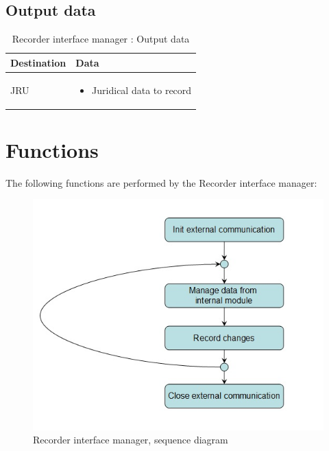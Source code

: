 \documentclass[nocc]{template/openetcs_report}
\begin{document}
\subsection{Output data}
			\begin{longtable}{|l|l|}
				\caption{Recorder interface manager : Output data}\\ 
				\hline
				
					\begin{minipage}[t]{0.35\linewidth} \textbf{Destination}	\end{minipage} 
				&	\begin{minipage}[t]{0.65\linewidth} \textbf{Data} \end{minipage} \\
				
				\hline
																																									
					\begin{minipage}[t]{0.35\linewidth} JRU	\end{minipage} 
				&	\begin{minipage}[t]{0.65\linewidth}
						\begin{itemize}
							\item Juridical data to record
						\end{itemize}
					\end{minipage} \\
				
				\hline
			\end{longtable}
\newpage				
\section{Functions}
The following functions are performed by the Recorder interface manager:
\begin{figure}[!h]
  \centering
  \includegraphics[width=\textwidth]{image/evc_recorder_interf_manager}
  \caption{Recorder interface manager, sequence diagram}
  \label{fig:Recorder interface manager, sequence diagram}
\end{figure}
\end{document}

